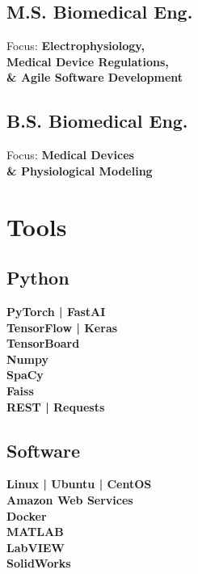 \documentclass[letterpaper]{deedy-resume} %
\begin{document}
\begin{minipage}[t]{0.33\textwidth}
\subsection{M.S. Biomedical Eng.}
Focus: \bf Electrophysiology, \\ 
Medical Device Regulations, \\ 
\& Agile Software Development \\

\sectionspace %

\subsection{B.S. Biomedical Eng.}
Focus: \bf Medical Devices \\
\& Physiological Modeling \\

\sectionspace %


\section{Tools}

\subsection{Python}
{\bf PyTorch | FastAI} \\
{\bf TensorFlow | Keras} \\
{\bf TensorBoard} \\ 
{\bf Numpy} \\ 
{\bf SpaCy} \\ 
{\bf Faiss} \\ 
{\bf REST | Requests} \\

\sectionspace %

\subsection{Software}
{\bf Linux | Ubuntu | CentOS} \\
{\bf Amazon Web Services} \\
{\bf Docker} \\
{\bf MATLAB} \\
{\bf LabVIEW} \\
{\bf SolidWorks} \\


\end{minipage}
\end{document}
